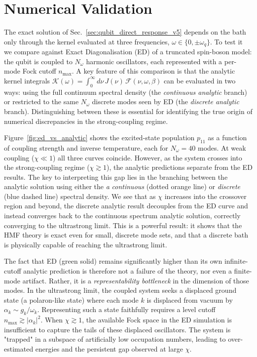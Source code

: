 \section{Numerical Validation}
\label{sec:numerical_results}

The exact solution of Sec.~\ref{sec:qubit_direct_response_v5} depends on the
bath only through the kernel evaluated at three frequencies,
$\omega \in \{0, \pm\omega_q\}$.
To test it we compare against Exact Diagonalisation (ED) of a truncated
spin-boson model: the qubit is coupled to $N_\omega$ harmonic oscillators,
each represented with a per-mode Fock cutoff $n_{\max}$.
A key feature of this comparison is that the analytic kernel integrals
$\mathcal{K}(\omega) = \int_0^\infty d\nu\, J(\nu)\, \mathcal{F}(\nu,\omega,\beta)$
can be evaluated in two ways: using the full continuum spectral density
(the \emph{continuous analytic} branch) or restricted to the same $N_\omega$
discrete modes seen by ED (the \emph{discrete analytic} branch).
Distinguishing between these is essential for identifying the true origin 
of numerical discrepancies in the strong-coupling regime.

Figure~\ref{fig:ed_vs_analytic} shows the excited-state population $p_{11}$
as a function of coupling strength and inverse temperature, each for $N_\omega = 40$ modes. At weak coupling ($\chi \ll 1$) all three curves coincide.
However, as the system crosses into the strong-coupling regime ($\chi \gtrsim 1$),
the analytic predictions separate from the ED results. The key to interpreting this gap lies in the branching between the analytic solution using either the \emph a \emph{continuous} (dotted orange line) or \emph{discrete} (blue dashed line) spectral density. We see that as $\chi$ increases into the crossover region and beyond,
the discrete analytic result decouples from the ED curve and instead converges back to the continuous spectrum analytic solution, correctly converging to the
ultrastrong limit. This is a powerful result: it shows that the HMF
theory is exact even for small, discrete mode sets, and that a discrete 
bath is physically capable of reaching the ultrastrong limit.

The fact that ED (green solid) remains significantly higher than its own
infinite-cutoff analytic prediction is therefore not a failure of the theory,
nor even a finite-mode artifact. Rather, it is a \emph{representability bottleneck} in the dimension of those modes. In the ultrastrong limit, the coupled system seeks a displaced ground state (a polaron-like state) where each mode $k$ is displaced from vacuum by $\alpha_k \sim g_k/\omega_k$. Representing such a state faithfully requires
a level cutoff $n_{\max} \gtrsim |\alpha_k|^2$. When $\chi \gtrsim 1$, the
available Fock space in the ED simulation is insufficient to capture the
tails of these displaced oscillators. The system is "trapped" in a subspace
of artificially low occupation numbers, leading to over-estimated energies
and the persistent gap observed at large $\chi$.

